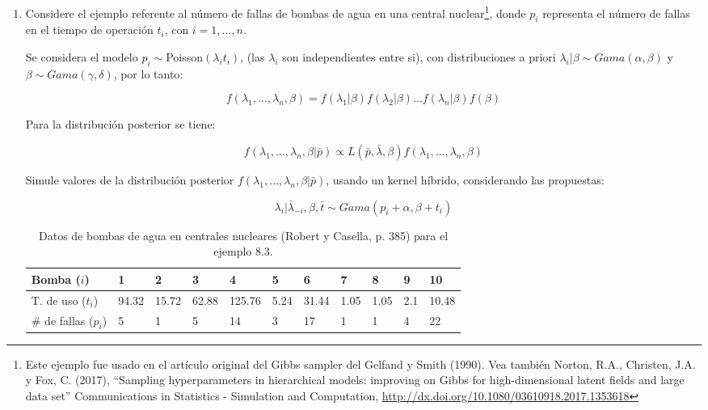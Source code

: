 \documentclass{article}
\begin{document}
\begin{enumerate}
\begin{proof}[Solución]
        El comprtamiento del logaritmo de la densidad es bastante uniforme, por lo que 
        podemos considerar que la cadena muestrea de la dsitribución desde el principio.\end{proof}

    \item Considere el ejemplo referente al número de fallas de bombas de agua en 
    una central nuclear\footnote{Este ejemplo fue usado en el artículo original 
    del Gibbs sampler del Gelfand y Smith (1990). Vea también Norton, R.A., 
    Christen, J.A. y Fox, C. (2017), ``Sampling hyperparameters in hierarchical 
    models: improving on Gibbs for high-dimensional latent fields and large data 
    set'' Communications in Statistics - Simulation and Computation, 
    \url{http://dx.doi.org/10.1080/03610918.2017.1353618}}, donde $p_i$ 
    representa el número de fallas en el tiempo de operación $t_i$, con $i = 1, 
    \dots, n$.

    Se considera el modelo $p_i \sim $Poisson$(\lambda_i t_i)$, (las $\lambda_i$ 
    son independientes entre si), con distribuciones a priori $\lambda_i|\beta 
    \sim Gama(\alpha, \beta)$ y $\beta \sim Gama(\gamma, \delta)$, por lo tanto:
    
    \[f (\lambda_1, \dots , \lambda_n, \beta) = f (\lambda_1|\beta)f (\lambda_2|
    \beta) \dots f(\lambda_n|\beta)f(\beta)\]
    
    Para la distribución posterior se tiene:
    
    \[f (\lambda_1, \dots , \lambda_n, \beta|\bar p) \propto L(\bar p, \bar \lambda,
     \beta)f (\lambda_1, \dots , \lambda_n, \beta)\]
    
    Simule valores de la distribución posterior $f (\lambda_1, \dots , \lambda_n, 
    \beta|\bar p)$, usando un kernel híbrido, considerando las propuestas: 
    
    \[\lambda_i|\bar \lambda_{-i}, \beta, \bar t \sim Gama(p_i + \alpha , \beta + 
    t_i)\]

    \begin{table}[!h] \centering
        \begin{tabular}{|l|l|l|l|l|l|l|l|l|l|l|}
            \hline
            Bomba ($i$)         & 1     & 2     & 3     & 4      & 5    & 6     & 7    & 8    & 9   & 10    \\ \hline
            T. de uso ($t_i$)    & 94.32 & 15.72 & 62.88 & 125.76 & 5.24 & 31.44 & 1.05 & 1.05 & 2.1 & 10.48 \\ \hline
            \# de fallas ($p_i$) & 5     & 1     & 5     & 14     & 3    & 17    & 1    & 1    & 4   & 22    \\ \hline
        \end{tabular} 
        \label{tab1}
        \caption{Datos de bombas de agua en centrales nucleares (Robert y Casella,
        p. 385) para el ejemplo 8.3.}
    \end{table}




\end{enumerate}
\end{document}
